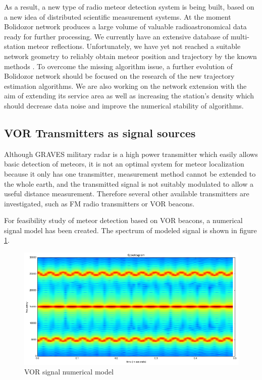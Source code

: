 \documentclass[twoside]{ctuthesis}
\theoremstyle{plain}
\theoremstyle{definition}
\theoremstyle{note}
\begin{document}
As a result, a new type of radio meteor detection system is being built, based on a new idea of distributed scientific measurement systems. At the moment Bolidozor network produces a large volume of valuable radioastronomical data ready for further processing.  
We currently have an extensive database of multi-station meteor reflections. Unfortunately, we have yet not reached a suitable network geometry to reliably obtain meteor position and trajectory by the known methods \cite{Doppler_method}. 
To overcome the missing algorithm issue, a further evolution of Bolidozor network should be focused on the research of the new trajectory estimation algorithms. We are also working on the network extension with the aim of extending its service area as well as increasing the station's density which should decrease data noise and improve the numerical stability of algorithms. 

\subsection{VOR Transmitters as signal sources}
Although GRAVES military radar is a high power transmitter which easily allows basic detection of meteors, it is not an optimal system for meteor localization because it only has one transmitter, measurement method cannot be extended to the whole earth, and the transmitted signal is not suitably modulated to allow a useful distance measurement.  Therefore several other available transmitters are investigated, such as FM radio transmitters or VOR beacons. 

For feasibility study of meteor detection based on VOR beacons, a numerical signal model has been created. The spectrum of modeled signal is shown in figure \ref{VOR_signal}.

\begin{figure}
\includegraphics[width=\textwidth]{./img/VOR_signal.png}
\caption{VOR signal numerical model}
\label{VOR_signal}
\end{figure}
\end{document}
